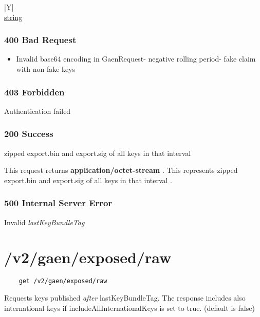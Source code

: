 \documentclass[a4paper
]{ubarticle}
\begin{document}
    
        \begin{ubresponses}{\textwidth}{|Y|}
        \\
        \hline
             \hyperref[sec:string] { string } \\
 \hline

        \end{ubresponses}
    
\subsubsection{ 400 Bad Request }
\begin{itemize}
\item Invalid base64 encoding in GaenRequest- negative rolling period- fake claim with non-fake keys
\end{itemize} 


\subsubsection{ 403 Forbidden }
Authentication failed
 


\subsubsection{ 200 Success }
zipped export.bin and export.sig of all keys in that interval
 

        
    This request returns \textbf{ application/octet-stream }. This represents zipped export.bin and export.sig of all keys in that interval
.

\subsubsection{ 500 Internal Server Error }
Invalid \emph{lastKeyBundleTag}
 


\section{ /v2/gaen/exposed/raw }
    \begin{verbatim}
    get /v2/gaen/exposed/raw
    \end{verbatim}
Requests keys published \emph{after} lastKeyBundleTag. The response includes also international keys if includeAllInternationalKeys is set to true. (default is false)
\end{document}
